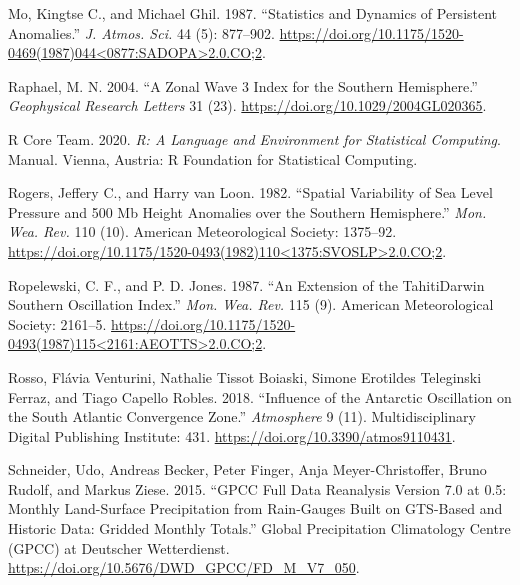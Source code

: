 \documentclass[smallextended]{svjour3}       %
\begin{document}
\leavevmode\hypertarget{ref-mo1987}{}%
Mo, Kingtse C., and Michael Ghil. 1987. ``Statistics and Dynamics of Persistent Anomalies.'' \emph{J. Atmos. Sci.} 44 (5): 877--902. \href{https://doi.org/10.1175/1520-0469(1987)044\%3C0877:SADOPA\%3E2.0.CO;2}{https://doi.org/10.1175/1520-0469(1987)044\textless{}0877:SADOPA\textgreater{}2.0.CO;2}.

\leavevmode\hypertarget{ref-raphael2004}{}%
Raphael, M. N. 2004. ``A Zonal Wave 3 Index for the Southern Hemisphere.'' \emph{Geophysical Research Letters} 31 (23). \url{https://doi.org/10.1029/2004GL020365}.

\leavevmode\hypertarget{ref-rcoreteam2020}{}%
R Core Team. 2020. \emph{R: A Language and Environment for Statistical Computing}. Manual. Vienna, Austria: R Foundation for Statistical Computing.

\leavevmode\hypertarget{ref-rogers1982}{}%
Rogers, Jeffery C., and Harry van Loon. 1982. ``Spatial Variability of Sea Level Pressure and 500 Mb Height Anomalies over the Southern Hemisphere.'' \emph{Mon. Wea. Rev.} 110 (10). American Meteorological Society: 1375--92. \href{https://doi.org/10.1175/1520-0493(1982)110\%3C1375:SVOSLP\%3E2.0.CO;2}{https://doi.org/10.1175/1520-0493(1982)110\textless{}1375:SVOSLP\textgreater{}2.0.CO;2}.

\leavevmode\hypertarget{ref-ropelewski1987}{}%
Ropelewski, C. F., and P. D. Jones. 1987. ``An Extension of the TahitiDarwin Southern Oscillation Index.'' \emph{Mon. Wea. Rev.} 115 (9). American Meteorological Society: 2161--5. \href{https://doi.org/10.1175/1520-0493(1987)115\%3C2161:AEOTTS\%3E2.0.CO;2}{https://doi.org/10.1175/1520-0493(1987)115\textless{}2161:AEOTTS\textgreater{}2.0.CO;2}.

\leavevmode\hypertarget{ref-rosso2018}{}%
Rosso, Flávia Venturini, Nathalie Tissot Boiaski, Simone Erotildes Teleginski Ferraz, and Tiago Capello Robles. 2018. ``Influence of the Antarctic Oscillation on the South Atlantic Convergence Zone.'' \emph{Atmosphere} 9 (11). Multidisciplinary Digital Publishing Institute: 431. \url{https://doi.org/10.3390/atmos9110431}.

\leavevmode\hypertarget{ref-schneider2015}{}%
Schneider, Udo, Andreas Becker, Peter Finger, Anja Meyer-Christoffer, Bruno Rudolf, and Markus Ziese. 2015. ``GPCC Full Data Reanalysis Version 7.0 at 0.5: Monthly Land-Surface Precipitation from Rain-Gauges Built on GTS-Based and Historic Data: Gridded Monthly Totals.'' Global Precipitation Climatology Centre (GPCC) at Deutscher Wetterdienst. \url{https://doi.org/10.5676/DWD_GPCC/FD_M_V7_050}.
\end{document}

